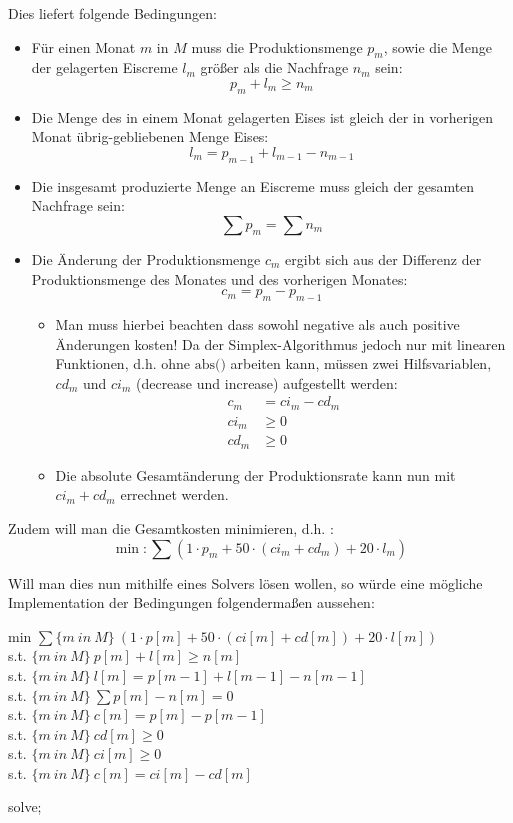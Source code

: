 Dies liefert folgende Bedingungen:
\begin{itemize}
\item Für einen Monat $m$ in $M$ muss die Produktionsmenge $p_m$, sowie die Menge der gelagerten Eiscreme $l_m$ größer als die Nachfrage $n_m$ sein:
\[ p_m + l_m \geq n_m \]
\item Die Menge des in einem Monat gelagerten Eises ist gleich der in vorherigen Monat übrig-gebliebenen Menge Eises:
\[ l_m = p_{m-1} + l_{m-1} - n_{m-1} \]
\item Die insgesamt produzierte Menge an Eiscreme muss gleich der gesamten Nachfrage sein:
\[ \sum p_m = \sum n_m \]
\item Die Änderung der Produktionsmenge $c_m$ ergibt sich aus der Differenz der Produktionsmenge des Monates und des vorherigen Monates: 
\[ c_m = p_{m} - p_{m-1} \] 
	\begin{itemize}
	\item Man muss hierbei beachten dass sowohl negative als auch positive Änderungen kosten! Da der Simplex-Algorithmus jedoch nur mit linearen Funktionen, d.h. ohne $\text{abs()}$ arbeiten kann, müssen zwei Hilfsvariablen, $cd_m$ und $ci_m$ (decrease und increase) aufgestellt werden:
	\begin{align*}
	c_m &= ci_m - cd_m \\
	ci_m &\geq 0		\\
	cd_m &\geq 0
	\end{align*}
	
	\item Die absolute Gesamtänderung der Produktionsrate kann nun mit $ci_m + cd_m$ errechnet werden.
 	\end{itemize}
\end{itemize}

Zudem will man die Gesamtkosten minimieren, d.h. :
\[ \min: \sum (1 \cdot p_m + 50 \cdot (ci_m + cd_m) + 20 \cdot l_m)\]

Will man dies nun mithilfe eines Solvers lösen wollen, so würde eine mögliche Implementation der Bedingungen folgendermaßen aussehen:
\newline

min $\sum\{m~in~M\} ~ (1 \cdot p[m] + 50 \cdot (ci[m] + cd[m]) + 20 \cdot l[m])$ \\
s.t. $\{m~in~M\} ~ p[m] + l[m] \geq n[m]$ \\
s.t. $\{m~in~M\} ~ l[m] = p[m - 1] + l[m - 1] - n[m - 1]$ \\
s.t. $\{m~in~M\} ~ \sum p[m] - n[m] = 0$ 	\\
s.t. $\{m~in~M\} ~ c[m] = p[m] - p[m-1]$ 	\\
s.t. $\{m~in~M\} ~ cd[m] \geq 0$			\\
s.t. $\{m~in~M\} ~ ci[m] \geq 0$			\\
s.t. $\{m~in~M\} ~ c[m] = ci[m] - cd[m]$	
\newline

solve;